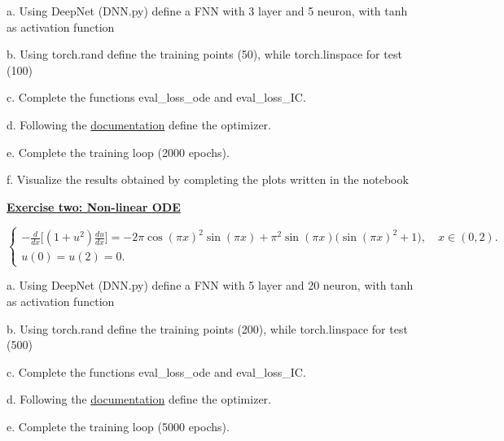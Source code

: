 \documentclass{article}
\newcommand{\step}[1]{\underline{\textbf{\large{#1}}} }
\begin{document}
    a. Using DeepNet (DNN.py) define a FNN with 3 layer and 5 neuron, with tanh as activation function
    
    b. Using torch.rand define the training points (50), while torch.linspace for test (100) 

    c. Complete the functions eval\_loss\_ode and eval\_loss\_IC.

    d. Following the \href{https://pytorch.org/docs/stable/generated/torch.optim.Adam.html}{documentation} define the optimizer.

    e. Complete the training loop (2000 epochs).

    f. Visualize the results obtained by completing the plots written in the notebook

    \begin{center}\step{Exercise two: Non-linear ODE}\end{center}

    \begin{center}
      $\begin{cases}
        \displaystyle -\frac{d}{dx}\Big[(1+u^2)\frac{du}{dx}\Big] = -2\pi\cos(\pi x)^2\sin(\pi x) +  \pi^2 \sin(\pi x)\big(\sin(\pi x)^2 +1\big), \quad x \in (0,2). \\[15pt] 

        u(0)= u(2) = 0.
      \end{cases}$
    \end{center}

    a. Using DeepNet (DNN.py) define a FNN with 5 layer and 20 neuron, with tanh as activation function
    
    b. Using torch.rand define the training points (200), while torch.linspace for test (500) 

    c. Complete the functions eval\_loss\_ode and eval\_loss\_IC.

    d. Following the \href{https://pytorch.org/docs/stable/generated/torch.optim.Adam.html}{documentation} define the optimizer.

    e. Complete the training loop (5000 epochs).
\end{document}
